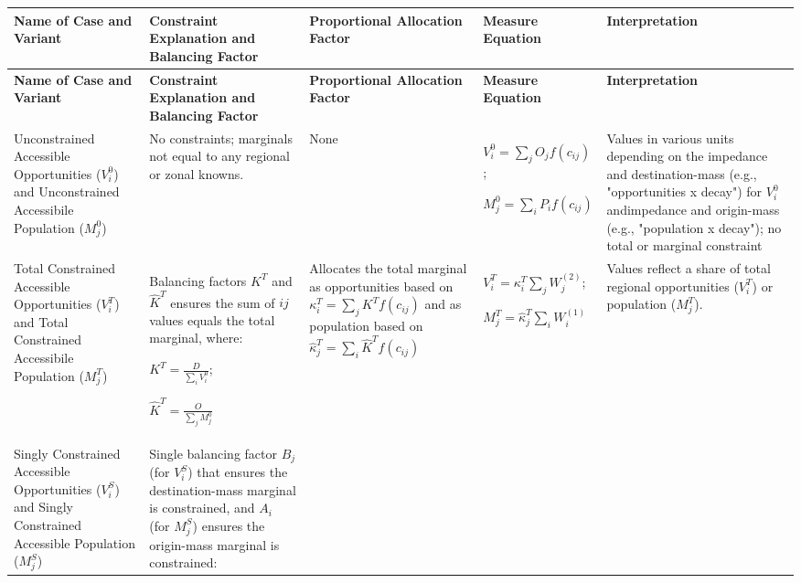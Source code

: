 {\tiny
\begin{longtable}{|p{2.5cm}|p{2.5cm}|p{2.5cm}|p{3cm}|p{3cm}|}
\hline
\textbf{Name of Case and Variant} & \textbf{Constraint Explanation and Balancing Factor} & \textbf{Proportional Allocation Factor} & \textbf{Measure Equation} & \textbf{Interpretation} \\
\hline
\endfirsthead

\hline
\textbf{Name of Case and Variant} & \textbf{Constraint Explanation and Balancing Factor} & \textbf{Proportional Allocation Factor} & \textbf{Measure Equation} & \textbf{Interpretation} \\
\hline
\endhead

Unconstrained Accessible Opportunities ($V_i^0$) and Unconstrained Accessibile Population ($M_j^0$)
& No constraints; marginals not equal to any regional or zonal knowns.
& None
& $V_i^0 = \sum_j O_j f(c_{ij})$;

$M_j^0 = \sum_i P_i f(c_{ij})$

& Values in various units depending on the impedance and destination-mass (e.g., "opportunities x decay") for $V_i^0$ andimpedance and origin-mass (e.g., "population x decay"); no total or marginal constraint \\
\hline

Total Constrained Accessible Opportunities ($V_i^T$) and Total Constrained Accessibile Population ($M_j^T$)
& Balancing factors $K^T$ and $\hat{K}^T$ ensures the sum of $ij$ values equals the total marginal, where:

$K^T = \frac{D}{\sum_i V_i^0}$;

$\hat{K}^T = \frac{O}{\sum_j M_j^0}$

& Allocates the total marginal as opportunities based on $\kappa_i^T = \sum_j K^T f(c_{ij})$ and as population based on  $\hat{\kappa}_j^T = \sum_i \hat K^T f(c_{ij})$

& $V^T_i = \kappa_i^T \sum_j W^{(2)}_j$;

$M_j^T = \hat{\kappa}_j^T \sum_i W^{(1)}_i$


& Values reflect a share of total regional opportunities ($V^T_i$) or population ($M^T_j$). \\
\hline

Singly Constrained Accessible Opportunities ($V_i^S$) and Singly Constrained Accessible Population ($M_j^S$)
& Single balancing factor $B_j$ (for $V_i^S$) that ensures the destination-mass marginal is constrained, and $A_i$ (for $M_j^S$) ensures the origin-mass marginal is constrained:


\end{longtable}}
